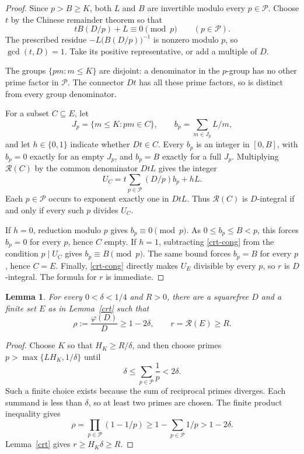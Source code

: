\documentclass[11pt]{article}
\newtheorem{lemma}[theorem]{Lemma}
\newcommand{\R}{\mathcal R}
\begin{document}
\begin{proof}
Since $p>B\ge K$, both $L$ and $B$ are invertible modulo every
$p\in\mathcal P$. Choose $t$ by the Chinese remainder theorem so that
\begin{equation}\label{crt-cong}
 tB(D/p)+L\equiv0\pmod p
 \qquad(p\in\mathcal P).
\end{equation}
The prescribed residue $-L\bigl(B(D/p)\bigr)^{-1}$ is nonzero modulo
$p$, so $\gcd(t,D)=1$. Take its positive representative, or add a
multiple of $D$.

The groups $\{pm:m\le K\}$ are disjoint: a denominator in the $p$-group
has no other prime factor in $\mathcal P$. The connector $Dt$ has all
these prime factors, so is distinct from every group denominator.

For a subset $C\subseteq E$, let
\[
 J_p=\{m\le K:pm\in C\},\qquad
 b_p=\sum_{m\in J_p}L/m,
\]
and let $h\in\{0,1\}$ indicate whether $Dt\in C$.
Every $b_p$ is an integer in $[0,B]$, with $b_p=0$ exactly for an empty
$J_p$, and $b_p=B$ exactly for a full $J_p$.
Multiplying $\R(C)$ by the common denominator $DtL$ gives the integer
\begin{equation}\label{numerator}
 U_C=t\sum_{p\in\mathcal P}(D/p)b_p+hL.
\end{equation}
Each $p\in\mathcal P$ occurs to exponent exactly one in $DtL$.
Thus $\R(C)$ is $D$-integral if and only if every such $p$ divides $U_C$.

If $h=0$, reduction modulo $p$ gives $b_p\equiv0\pmod p$.
As $0\le b_p\le B<p$, this forces $b_p=0$ for every $p$, hence $C$ empty.
If $h=1$, subtracting \eqref{crt-cong} from the condition $p\mid U_C$
gives $b_p\equiv B\pmod p$. The same bound forces $b_p=B$ for every $p$,
hence $C=E$.
Finally, \eqref{crt-cong} directly makes $U_E$ divisible by every $p$,
so $r$ is $D$-integral. The formula for $r$ is immediate.
\end{proof}

\begin{lemma}\label{amplification}
For every $0<\delta<1/4$ and $R>0$, there are a squarefree $D$ and a
finite set $E$ as in Lemma~\ref{crt} such that
\[
 \rho:=\frac{\varphi(D)}D\ge1-2\delta,
 \qquad r=\R(E)\ge R.
\]
\end{lemma}
\begin{proof}
Choose $K$ so that $H_K\ge R/\delta$, and then choose primes
$p>\max\{LH_K,1/\delta\}$ until
\[
 \delta\le\sum_{p\in\mathcal P}\frac1p<2\delta.
\]
Such a finite choice exists because the sum of reciprocal primes
diverges. Each summand is less than $\delta$, so at least two primes
are chosen. The finite product inequality gives
\[
 \rho=\prod_{p\in\mathcal P}(1-1/p)
 \ge1-\sum_{p\in\mathcal P}1/p>1-2\delta.
\]
Lemma~\ref{crt} gives $r\ge H_K\delta\ge R$.
\end{proof}
\end{document}
